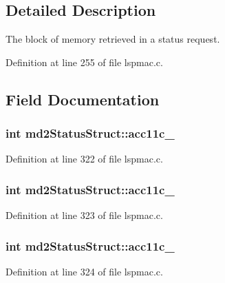 \subsection{Detailed Description}
The block of memory retrieved in a status request. 

Definition at line 255 of file lspmac.\-c.



\subsection{Field Documentation}
\hypertarget{structmd2StatusStruct_a69fc2e30a5de0a11c992d133e7a761cd}{
\subsubsection[{acc11c\-\_\-1}]{\setlength{\rightskip}{0pt plus 5cm}int md2\-Status\-Struct\-::acc11c\-\_}}\label{structmd2StatusStruct_a69fc2e30a5de0a11c992d133e7a761cd}


Definition at line 322 of file lspmac.\-c.

\hypertarget{structmd2StatusStruct_ad186f06cb4670b00b8af8264d1da66a4}{
\subsubsection[{acc11c\-\_\-2}]{\setlength{\rightskip}{0pt plus 5cm}int md2\-Status\-Struct\-::acc11c\-\_}}\label{structmd2StatusStruct_ad186f06cb4670b00b8af8264d1da66a4}


Definition at line 323 of file lspmac.\-c.

\hypertarget{structmd2StatusStruct_a20a15620e12888f61c0aed1e47e97932}{
\subsubsection[{acc11c\-\_\-3}]{\setlength{\rightskip}{0pt plus 5cm}int md2\-Status\-Struct\-::acc11c\-\_}}\label{structmd2StatusStruct_a20a15620e12888f61c0aed1e47e97932}


Definition at line 324 of file lspmac.\-c.

